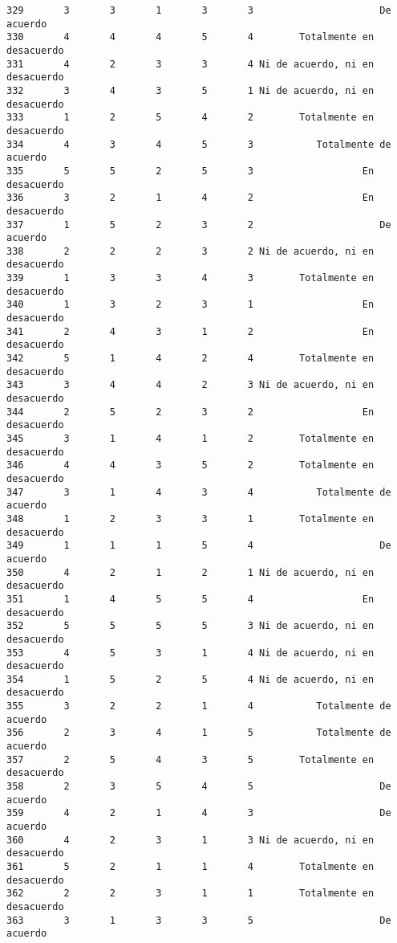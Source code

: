 \documentclass[
  letterpaper,
  DIV=11,
  numbers=noendperiod]{scrartcl}
\begin{document}
\begin{verbatim}
329       3       3       1       3       3                      De acuerdo
330       4       4       4       5       4        Totalmente en desacuerdo
331       4       2       3       3       4 Ni de acuerdo, ni en desacuerdo
332       3       4       3       5       1 Ni de acuerdo, ni en desacuerdo
333       1       2       5       4       2        Totalmente en desacuerdo
334       4       3       4       5       3           Totalmente de acuerdo
335       5       5       2       5       3                   En desacuerdo
336       3       2       1       4       2                   En desacuerdo
337       1       5       2       3       2                      De acuerdo
338       2       2       2       3       2 Ni de acuerdo, ni en desacuerdo
339       1       3       3       4       3        Totalmente en desacuerdo
340       1       3       2       3       1                   En desacuerdo
341       2       4       3       1       2                   En desacuerdo
342       5       1       4       2       4        Totalmente en desacuerdo
343       3       4       4       2       3 Ni de acuerdo, ni en desacuerdo
344       2       5       2       3       2                   En desacuerdo
345       3       1       4       1       2        Totalmente en desacuerdo
346       4       4       3       5       2        Totalmente en desacuerdo
347       3       1       4       3       4           Totalmente de acuerdo
348       1       2       3       3       1        Totalmente en desacuerdo
349       1       1       1       5       4                      De acuerdo
350       4       2       1       2       1 Ni de acuerdo, ni en desacuerdo
351       1       4       5       5       4                   En desacuerdo
352       5       5       5       5       3 Ni de acuerdo, ni en desacuerdo
353       4       5       3       1       4 Ni de acuerdo, ni en desacuerdo
354       1       5       2       5       4 Ni de acuerdo, ni en desacuerdo
355       3       2       2       1       4           Totalmente de acuerdo
356       2       3       4       1       5           Totalmente de acuerdo
357       2       5       4       3       5        Totalmente en desacuerdo
358       2       3       5       4       5                      De acuerdo
359       4       2       1       4       3                      De acuerdo
360       4       2       3       1       3 Ni de acuerdo, ni en desacuerdo
361       5       2       1       1       4        Totalmente en desacuerdo
362       2       2       3       1       1        Totalmente en desacuerdo
363       3       1       3       3       5                      De acuerdo

\end{verbatim}
\end{document}
